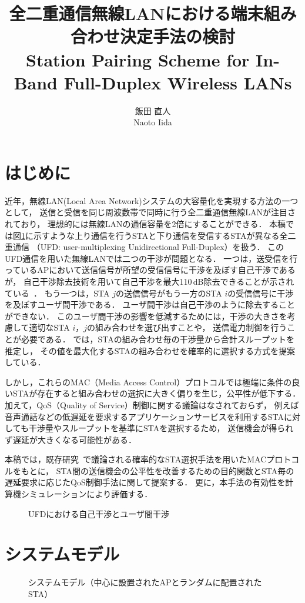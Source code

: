\documentclass[twocolumn, a4paper]{ieicejsp}
\title{{\bf 全二重通信無線LANにおける端末組み合わせ決定手法の検討}
  {\normalsize \\Station Pairing Scheme for In-Band Full-Duplex Wireless LANs}}
\author{
    飯田 直人\\ Naoto Iida
  }
\begin{document}
\maketitle
\section{はじめに}
	近年，無線LAN(Local Area Network)システムの大容量化を実現する方法の一つとして，
	送信と受信を同じ周波数帯で同時に行う全二重通信無線LANが注目されており，
	理想的には無線LANの通信容量を2倍にすることができる．
	本稿では図\ref{fig:topology}に示すような上り通信を行うSTAと下り通信を受信するSTAが異なる全二重通信
	（UFD: user-multiplexing Unidirectional Full-Duplex）を扱う．
	このUFD通信を用いた無線LANでは二つの干渉が問題となる．
	一つは，送受信を行っているAPにおいて送信信号が所望の受信信号に干渉を及ぼす自己干渉であるが，
	自己干渉除去技術を用いて自己干渉を最大110\,dB除去できることが示されている~\cite{stanford1}．
	もう一つは，STA $j$の送信信号がもう一方のSTA $i$の受信信号に干渉を及ぼすユーザ間干渉である．
	ユーザ間干渉は自己干渉のように除去することができない．
	このユーザ間干渉の影響を低減するためには，干渉の大きさを考慮して適切なSTA $i$，$j$の組み合わせを選び出すことや，
	送信電力制御を行うことが必要である．
	\cite{promac}では，STAの組み合わせ毎の干渉量から合計スループットを推定し，
	その値を最大化するSTAの組み合わせを確率的に選択する方式を提案している．
	\par
	しかし，これらのMAC（Media Access Control）プロトコルでは極端に条件の良いSTAが存在すると組み合わせの選択に大きく偏りを生じ，公平性が低下する．
	加えて，QoS（Quality of Service）制御に関する議論はなされておらず，
	例えば音声通話などの低遅延を要求するアプリケーションサービスを利用するSTAに対しても干渉量やスループットを基準にSTAを選択するため，
	送信機会が得られず遅延が大きくなる可能性がある．
	\par
	本稿では，既存研究~\cite{promac}で議論される確率的なSTA選択手法を用いたMACプロトコルをもとに，
	STA間の送信機会の公平性を改善するための目的関数とSTA毎の遅延要求に応じたQoS制御手法に関して提案する．
	更に，本手法の有効性を計算機シミュレーションにより評価する．

	\begin{figure}[t]
		\centering
		\caption{UFDにおける自己干渉とユーザ間干渉}
		\label{fig:topology}
	\end{figure}
\section{システムモデル}
	\begin{figure}[t]
		\centering
		\caption{システムモデル（中心に設置されたAPとランダムに配置されたSTA）}
		\label{fig:model}
	\end{figure}
\end{document}
